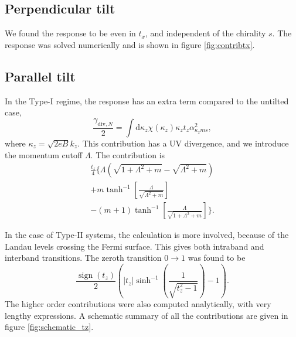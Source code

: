 \documentclass[%
 reprint,
 amsmath,amssymb,
 aps,
]{revtex4-2}
\DeclareMathOperator\sign{sign}
\begin{document}
\subsection{Perpendicular tilt}
We found the response to be even in \( t_x \), and independent of the chirality \( s \).
The response was solved numerically and is shown in figure \ref{fig:contribtx}.

\subsection{Parallel tilt}
In the Type-I regime, the response has an extra term compared to the untilted case,
\begin{equation}
  \label{eq:5}
  \frac{\gamma_{\text{div}, N}}{2} = \int \mathrm{d} \kappa_z \chi(\kappa_z) \kappa_z t_z \alpha_{\kappa_z m s}^2,
\end{equation}
where \( \kappa_z = \sqrt{2 e B} k_{z} \).
This contribution has a UV divergence, and we introduce the momentum cutoff \( \Lambda \).
The contribution is
\begin{multline}
  \label{eq:6}
  \frac{t_z}{4}
  \Bigg\{
  \Lambda \left(\sqrt{1 + \Lambda^2 + m} - \sqrt{\Lambda^2 + m} \right)\\
  + m \tanh^{-1} \left[\frac{\Lambda}{\sqrt{\Lambda^2 + m} }\right]\\
  - (m+1) \tanh^{-1} \left[ \frac{\Lambda}{\sqrt{1 + \Lambda^2 + m }} \right]
  \Bigg\}.
\end{multline}

In the case of Type-II systems, the calculation is more involved, because of the Landau levels crossing the Fermi surface.
This gives both intraband and interband transitions.
The zeroth transition \( 0 \to 1 \) was found to be
\begin{equation}
  \label{eq:7}
  \frac{\sign(t_z)}{2}
  \left( |t_z| \sinh^{-1} \left(\frac{1}{\sqrt{t_{z}^2 -1} }\right) -1 \right).
\end{equation}
The higher order contributions were also computed analytically, with very lengthy expressions.
A schematic summary of all the contributions are given in figure \ref{fig:schematic_tz}.
\end{document}
